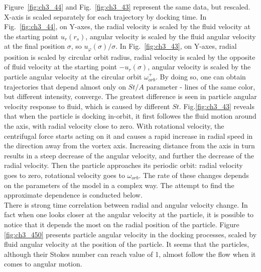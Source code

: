 \documentclass[../main.tex]{subfiles}
\begin{document}
Figure~\ref{fig:ch3_44} and Fig.~\ref{fig:ch3_43} represent the same data, but rescaled. X-axis is scaled separately for each trajectory by docking time. In Fig.~\ref{fig:ch3_44}, on Y-axes, the radial velocity is scaled by the fluid velocity at the starting point $u_r(r_s)$, angular velocity is scaled by the fluid angular velocity at the final position $\sigma$, so $u_{\varphi}(\sigma)/\sigma$. In Fig.~\ref{fig:ch3_43},
on Y-axes, radial position is scaled by circular orbit radius, radial velocity is scaled by the opposite of fluid velocity at the starting point $-u_r(\sigma)$, angular velocity is scaled by the particle angular velocity at the circular orbit $\omega^+_{orb}$. By doing so, one can obtain trajectories that depend almost only on $St/A$ parameter - lines of the same color, but different intensity, converge. The greatest difference is seen in particle angular velocity response to fluid, which is caused by different $St$. Fig.\ref{fig:ch3_43} reveals that when the particle is docking in-orbit, it first followes the fluid motion around the axis, with radial velocity close to zero. With rotational velocity, the centrifugal force starts acting on it and causes a rapid increase in radial speed in the direction away from the vortex axis. Increasing distance from the axis in turn results in a steep decrease of the angular velocity, and further the decrease of the radial velocity. Then the particle approaches its periodic orbit: radial velocity goes to zero, rotational velocity goes to $\omega_{orb}$. The rate of these changes depends on the parameters of the model in a complex way. The attempt to find the approximate dependence is conducted below.\\
There is strong time correlation between radial and angular velocity change. In fact when one looks closer at the angular velocity at the particle, it is possible to notice that it depends the most on the radial position of the particle. Figure \ref{fig:ch3_450} presents particle angular velocity in the docking processes, scaled by fluid angular velocity at the position of the particle. It seems that the particles, although their Stokes number can reach value of 1, almost follow the flow when it comes to angular motion.
\end{document}
